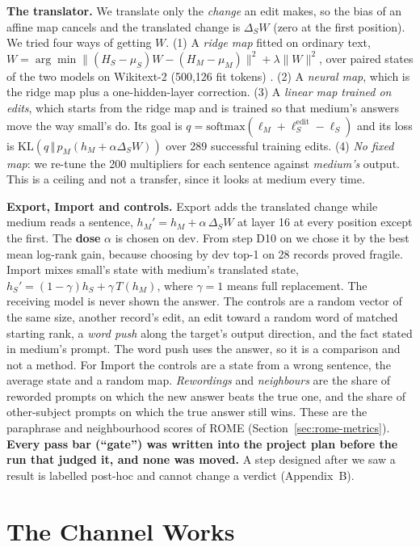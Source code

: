 \textbf{The translator.} We translate only the \emph{change} an edit makes, so the bias of an affine map cancels and the translated change is $\Delta_S W$ (zero at the first position). We tried four ways of getting $W$. (1) A \emph{ridge map} fitted on ordinary text, $W=\arg\min\lVert(H_S-\mu_S)W-(H_M-\mu_M)\rVert^2+\lambda\lVert W\rVert^2$, over paired states of the two models on Wikitext-2 \cite{r55} (500,126 fit tokens) \cite{r45}. (2) A \emph{neural map}, which is the ridge map plus a one-hidden-layer correction. (3) A \emph{linear map trained on edits}, which starts from the ridge map and is trained so that medium's answers move the way small's do. Its goal is $q=\mathrm{softmax}(\ell_M+\ell_S^{\mathrm{edit}}-\ell_S)$ and its loss is $\mathrm{KL}(q\,\Vert\,p_M(h_M+\alpha\Delta_SW))$ over 289 successful training edits. (4) \emph{No fixed map}: we re-tune the 200 multipliers for each sentence against \emph{medium's} output. This is a ceiling and not a transfer, since it looks at medium every time.

\textbf{Export, Import and controls.} Export adds the translated change while medium reads a sentence, $h_M'=h_M+\alpha\,\Delta_S W$ at layer 16 at every position except the first. The \textbf{dose} $\alpha$ is chosen on dev. From step D10 on we chose it by the best mean log-rank gain, because choosing by dev top-1 on 28 records proved fragile. Import mixes small's state with medium's translated state, $h_S'=(1-\gamma)h_S+\gamma\,T(h_M)$, where $\gamma=1$ means full replacement. The receiving model is never shown the answer. The controls are a random vector of the same size, another record's edit, an edit toward a random word of matched starting rank, a \emph{word push} along the target's output direction, and the fact stated in medium's prompt. The word push uses the answer, so it is a comparison and not a method. For Import the controls are a state from a wrong sentence, the average state and a random map. \emph{Rewordings} and \emph{neighbours} are the share of reworded prompts on which the new answer beats the true one, and the share of other-subject prompts on which the true answer still wins. These are the paraphrase and neighbourhood scores of ROME \cite{r2} (Section~\ref{sec:rome-metrics}). \textbf{Every pass bar (``gate'') was written into the project plan before the run that judged it, and none was moved.} A step designed after we saw a result is labelled post-hoc and cannot change a verdict (Appendix~B).

\section{The Channel Works}\label{sec:channel}

